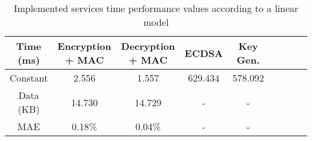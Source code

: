\begin{table}[h!]
\centering
\def\arraystretch{1.5}
\begin{tabular}{|c|c|c|c|c|c|c|c|c|}
\hline
	Time (ms) & Encryption + MAC & Decryption + MAC & ECDSA & Key Gen. \\ \hline
	Constant  & 2.556  & 1.557   & 629.434 & 578.092 \\ \hline
	Data (KB) & 14.730  & 14.729 & - & - \\ \hline
	MAE	  & 0.18\% & 0.04\%  & - & - \\ \hline
\end{tabular}
\caption{Implemented services time performance values according to a linear model}
\label{tab:services-model}
\end{table}
